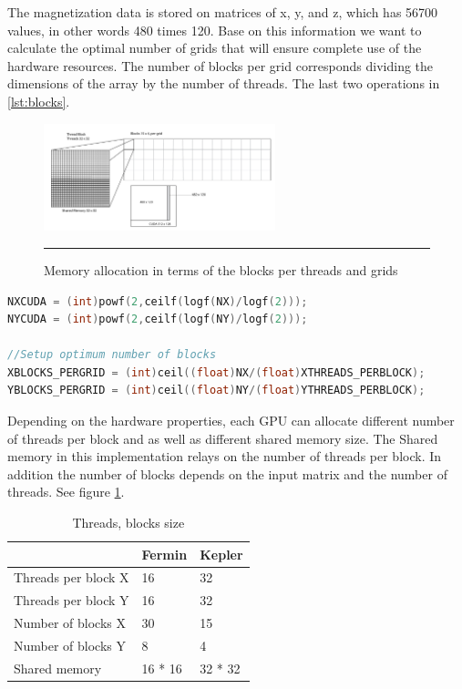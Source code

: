 The magnetization data is stored on matrices of x, y, and z, which has 56700 values, in other words 480 times 120. Base on this information we want to calculate the optimal number of grids that will ensure complete use of the hardware resources. The number of blocks per grid corresponds dividing  the dimensions of the array by the number of threads. The last two operations in \ref{lst:blocks}.

\begin{figure}[htbp]
	\centering
		\includegraphics[width=0.6\textwidth]{Figures/block.png}
		\rule{35em}{0.2pt}
	\caption[Grid layout]{Memory allocation in terms of the blocks per threads and grids}
	\label{fig:block}
\end{figure}

\begin{lstlisting}[language=C++, label={lst:blocks}, caption={Device capacity calculation and number of block per grid}]	
NXCUDA = (int)powf(2,ceilf(logf(NX)/logf(2)));
NYCUDA = (int)powf(2,ceilf(logf(NY)/logf(2)));

//Setup optimum number of blocks
XBLOCKS_PERGRID = (int)ceil((float)NX/(float)XTHREADS_PERBLOCK); 
YBLOCKS_PERGRID = (int)ceil((float)NY/(float)YTHREADS_PERBLOCK);
\end{lstlisting}

Depending on the hardware properties, each GPU can allocate different number of threads per block and as well as different shared memory size. The Shared memory in this implementation relays on the number of threads per block. In addition the number of blocks depends on the input matrix and the number of threads. See figure \ref{fig:block}.

\begin{table}[h]
\centering
\begin{tabular}{| l | l | l |}
\hline
 & Fermin & Kepler \\
\hline
Threads per block X  & 16 & 32 \\
\hline
Threads per block Y  & 16 & 32 \\
\hline
Number of blocks X & 30 & 15 \\
\hline
Number of blocks Y & 8 & 4 \\
\hline
Shared memory & 16 * 16 & 32 * 32 \\
\hline
\end{tabular}
\caption{Threads, blocks size}
\label{tab:threads}
\end{table}

